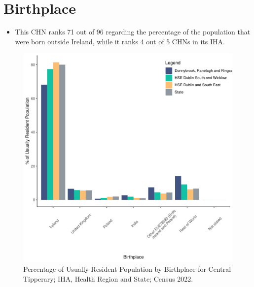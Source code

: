 \documentclass{article}
\begin{document}
\section{Birthplace}\label{sect:Birth}
\begin{itemize}
\item This CHN ranks  71 out of 96 regarding the percentage of the population that were born outside Ireland, while it ranks  4 out of 5 CHNs in its IHA.
\end{itemize}
\begin{figure}[H]
	\centering
	\includegraphics[width = 130mm]{../figures/BirthED.pdf}
	\caption{Percentage of Usually Resident Population by Birthplace for Central Tipperary; IHA, Health Region and State; Census 2022.}
	\label{fig:vbnv}
	\end{figure}
	
\end{document}
